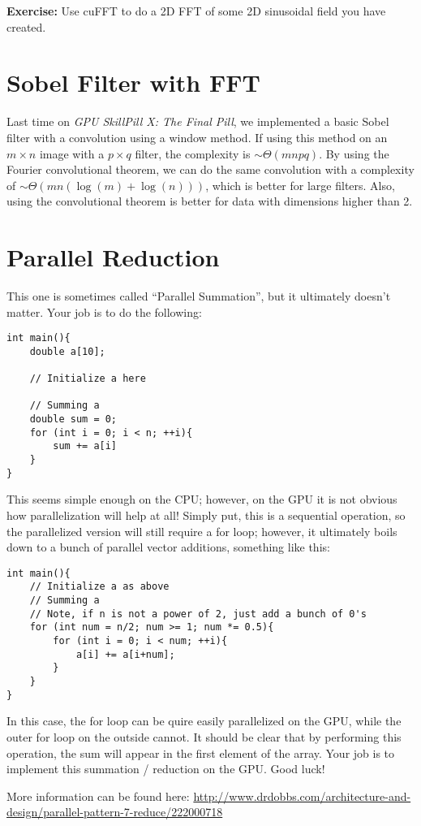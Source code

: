 \documentclass[11pt]{article}
\begin{document}
\textbf{Exercise:} Use cuFFT to do a 2D FFT of some 2D sinusoidal field you have created.

\newpage

\section*{Sobel Filter with FFT}

Last time on \textit{GPU SkillPill X: The Final Pill}, we implemented a basic Sobel filter with a convolution using a window method. If using this method on an $m \times n$ image with a $p \times q$ filter, the complexity is $\sim \Theta(mnpq)$. By using the Fourier convolutional theorem, we can do the same convolution with a complexity of $\sim \Theta(mn(\log (m) + \log (n)))$, which is better for large filters. Also, using the convolutional theorem is better for data with dimensions higher than 2.

\newpage

\section*{Parallel Reduction}

This one is sometimes called ``Parallel Summation'', but it ultimately doesn't matter. Your job is to do the following:

\begin{lstlisting}
int main(){
    double a[10];
    
    // Initialize a here
    
    // Summing a
    double sum = 0;
    for (int i = 0; i < n; ++i){
        sum += a[i]
    }
}
\end{lstlisting}

This seems simple enough on the CPU; however, on the GPU it is not obvious how parallelization will help at all! Simply put, this is a sequential operation, so the parallelized version will still require a for loop; however, it ultimately boils down to a bunch of parallel vector additions, something like this:

\begin{lstlisting}
int main(){
    // Initialize a as above
    // Summing a
    // Note, if n is not a power of 2, just add a bunch of 0's
    for (int num = n/2; num >= 1; num *= 0.5){
        for (int i = 0; i < num; ++i){
            a[i] += a[i+num];
        }
    }
}
\end{lstlisting}

In this case, the for loop can be quire easily parallelized on the GPU, while the outer for loop on the outside cannot. 
It should be clear that by performing this operation, the sum will appear in the first element of the array.
Your job is to implement this summation / reduction on the GPU. Good luck!

More information can be found here: \url{http://www.drdobbs.com/architecture-and-design/parallel-pattern-7-reduce/222000718}
\end{document}
